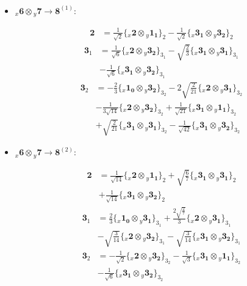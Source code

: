 \documentclass[english]{article}
\newcommand{\rep}[1]{\mathbf{#1}}
\newcommand{\repx}[2]{{}_{#2}\mathbf{#1}}
\newcommand{\tsprodx}[2]{\repx{#1}{x}\otimes\repx{#2}{y}}
\newcommand{\subcgs}[3]{\big\{ \tsprodx{#1}{#2}\big\}^{}_{#3}}
\begin{document}
\begin{itemize}
\begin{fleqn}
\begin{align*}
\end{align*}
\end{fleqn}
\item $\tsprodx{6}{7}\to\rep{8}^{(1)}$:
\begin{fleqn}
\begin{align*}
\rep{2} & = \frac{1}{\sqrt{2}}\subcgs{2}{1_{1}}{2}-\frac{1}{\sqrt{2}}\subcgs{3_{1}}{3_{2}}{2}
\end{align*}
\begin{align*}
\rep{3}_{1} & = \frac{1}{\sqrt{6}}\subcgs{2}{3_{2}}{3_{1}}-\sqrt{\frac{2}{3}}\subcgs{3_{1}}{3_{1}}{3_{1}} \\ 
 & -\frac{1}{\sqrt{6}}\subcgs{3_{1}}{3_{2}}{3_{1}}
\end{align*}
\begin{align*}
\rep{3}_{2} & = -\frac{2}{3}\subcgs{1_{0}}{3_{2}}{3_{2}}-2 \sqrt{\frac{2}{21}}\subcgs{2}{3_{1}}{3_{2}} \\ 
 & -\frac{1}{3 \sqrt{14}}\subcgs{2}{3_{2}}{3_{2}}+\frac{1}{\sqrt{21}}\subcgs{3_{1}}{1_{1}}{3_{2}} \\ 
 & +\sqrt{\frac{2}{21}}\subcgs{3_{1}}{3_{1}}{3_{2}}-\frac{1}{\sqrt{42}}\subcgs{3_{1}}{3_{2}}{3_{2}}
\end{align*}
\end{fleqn}
\item $\tsprodx{6}{7}\to\rep{8}^{(2)}$:
\begin{fleqn}
\begin{align*}
\rep{2} & = \frac{1}{\sqrt{14}}\subcgs{2}{1_{1}}{2}+\sqrt{\frac{6}{7}}\subcgs{3_{1}}{3_{1}}{2} \\ 
 & +\frac{1}{\sqrt{14}}\subcgs{3_{1}}{3_{2}}{2}
\end{align*}
\begin{align*}
\rep{3}_{1} & = \frac{2}{3}\subcgs{1_{0}}{3_{1}}{3_{1}}+\frac{2 \sqrt{\frac{2}{7}}}{3}\subcgs{2}{3_{1}}{3_{1}} \\ 
 & -\sqrt{\frac{3}{14}}\subcgs{2}{3_{2}}{3_{1}}-\sqrt{\frac{3}{14}}\subcgs{3_{1}}{3_{2}}{3_{1}}
\end{align*}
\begin{align*}
\rep{3}_{2} & = -\frac{1}{\sqrt{2}}\subcgs{2}{3_{2}}{3_{2}}-\frac{1}{\sqrt{3}}\subcgs{3_{1}}{1_{1}}{3_{2}} \\ 
 & -\frac{1}{\sqrt{6}}\subcgs{3_{1}}{3_{2}}{3_{2}}
\end{align*}
\end{fleqn}
\end{itemize}
\end{document}
